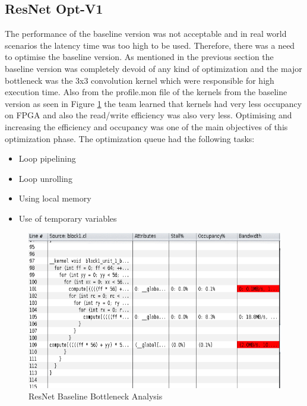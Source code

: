 \subsection{ResNet Opt-V1}
The performance of the baseline version was not acceptable and in real world scenarios the latency time was too high to be used. Therefore, there was a need to optimise the baseline version. As mentioned in the previous section the baseline version was completely devoid of any kind of optimization and the major bottleneck was the 3x3 convolution kernel which were responsible for high execution time. Also from the profile.mon file of the kernels from the baseline version as seen in Figure \ref{fig:ResNet50_baseline} the team learned that kernels had very less occupancy on FPGA and also the read/write efficiency was also very less. Optimising and increasing the efficiency and occupancy was one of the main objectives of this optimization phase. The optimization queue had the following tasks:
\begin{itemize}
    \item Loop pipelining
    \item Loop unrolling
    \item Using local memory 
    \item Use of temporary variables
\end{itemize}

\begin{figure}[!htb]
 \includegraphics[width=\textwidth,height=\textheight,keepaspectratio]{img/Baselinebottleneck.png}
 \caption{ResNet Baseline Bottleneck Analysis}
 \label{fig:ResNet50_baseline}
\end{figure}

